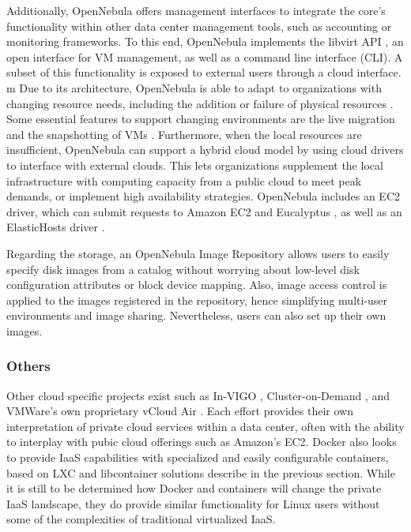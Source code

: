 Additionally, OpenNebula offers management interfaces to integrate the core's functionality within other data center management tools, such as accounting or monitoring frameworks. To this end, OpenNebula implements the libvirt API \cite{www/libvirt}, an open interface for VM management, as well as a command line interface (CLI). A subset of this functionality is exposed to external users through a cloud interface.
m
Due to its architecture, OpenNebula is able to adapt to organizations with changing re­source needs, including the addition or failure of physical resources \cite{sotomayorvirtual}. Some essential features to support changing environments are the live migration and the snapshotting of VMs \cite{www/opennebula}. Furthermore, when the local resources are insufficient, OpenNebula can support a hybrid cloud model by using cloud drivers to inter­face with external clouds. This lets organizations supplement the local infrastructure with computing capacity from a public cloud to meet peak demands, or implement high availability strategies. OpenNebula includes an EC2 driver, which can submit requests to Amazon EC2 and Eucalyptus \cite{nurmi2008eos}, as well as an ElasticHosts driver \cite{www/elastichosts}.

Regarding the storage, an OpenNebula Image Repository allows users to easily specify disk images from a catalog without worrying about low-level disk configuration attributes or block device mapping. Also, image access control is applied to the images registered in the repository, hence simplifying multi-user environments and image sharing. Nevertheless, users can also set up their own images. 


\subsubsection{Others}

Other cloud specific projects exist such as In-VIGO \cite{adabala2005virtualized}, Cluster-on-Demand \cite{chase2003dvc}, and VMWare's own proprietary vCloud Air \cite{www-vmware-vcloud}.  Each effort provides their own interpretation of private cloud services within a data center, often with the ability to interplay with pubic cloud offerings such as Amazon's EC2. Docker \cite{merkel2014docker} also looks to provide IaaS capabilities with specialized and easily configurable containers, based on LXC and libcontainer solutions describe in the previous section. While it is still to be determined how Docker and containers will change the private IaaS landscape, they do provide similar functionality for Linux users without some of the complexities of traditional virtualized IaaS.  



